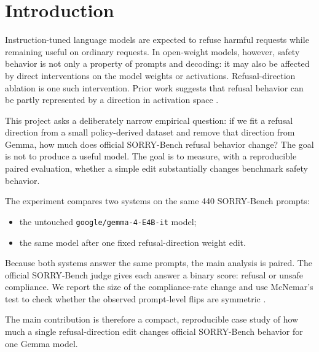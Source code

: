 \section{Introduction}

Instruction-tuned language models are expected to refuse harmful requests while
remaining useful on ordinary requests. In open-weight models, however, safety
behavior is not only a property of prompts and decoding: it may also be affected
by direct interventions on the model weights or activations. Refusal-direction
ablation is one such intervention. Prior work suggests that refusal behavior can
be partly represented by a direction in activation space \citep{arditi2024refusal}.

This project asks a deliberately narrow empirical question: if we fit a refusal
direction from a small policy-derived dataset and remove that direction from
Gemma, how much does official SORRY-Bench refusal behavior change? The goal is
not to produce a useful model. The goal is to measure, with a reproducible paired
evaluation, whether a simple edit substantially changes benchmark safety
behavior.

The experiment compares two systems on the same 440 SORRY-Bench prompts:

\begin{itemize}
  \item the untouched \texttt{google/gemma-4-E4B-it} model;
  \item the same model after one fixed refusal-direction weight edit.
\end{itemize}

Because both systems answer the same prompts, the main analysis is paired. The
official SORRY-Bench judge gives each answer a binary score: refusal or unsafe
compliance. We report the size of the compliance-rate change and use McNemar's
test to check whether the observed prompt-level flips are symmetric
\citep{mcnemar1947note,raschka2018model}.

The main contribution is therefore a compact, reproducible case study of how
much a single refusal-direction edit changes official SORRY-Bench behavior for
one Gemma model.
